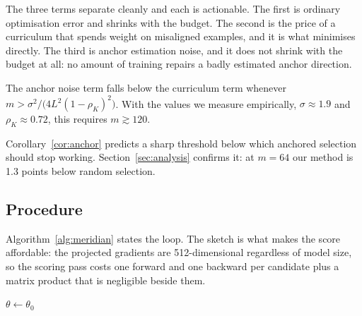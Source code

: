 The three terms separate cleanly and each is actionable. The first is ordinary
optimisation error and shrinks with the budget. The second is the price of a
curriculum that spends weight on misaligned examples, and it is what \method{}
minimises directly. The third is anchor estimation noise, and it does not
shrink with the budget at all: no amount of training repairs a badly estimated
anchor direction.

\begin{corollary}
\label{cor:anchor}
The anchor noise term falls below the curriculum term whenever
$m > \sigma^2 / \bigl(4 L^2 (1 - \rho_K)^2\bigr)$. With the values we measure
empirically, $\sigma \approx 1.9$ and $\rho_K \approx 0.72$, this requires
$m \gtrsim 120$.
\end{corollary}

Corollary~\ref{cor:anchor} predicts a sharp threshold below which anchored
selection should stop working. Section~\ref{sec:analysis} confirms it: at
$m = 64$ our method is 1.3 points below random selection.

\subsection{Procedure}

Algorithm~\ref{alg:meridian} states the loop. The sketch is what makes the
score affordable: the projected gradients are 512-dimensional regardless of
model size, so the scoring pass costs one forward and one backward per
candidate plus a matrix product that is negligible beside them.

\begin{algorithm}[t]
  \caption{\method{} anchored curriculum selection}
  \label{alg:meridian}
  \SetAlgoLined
  $\theta \gets \theta_0$\;
  \Return{$\theta$}
\end{algorithm}

